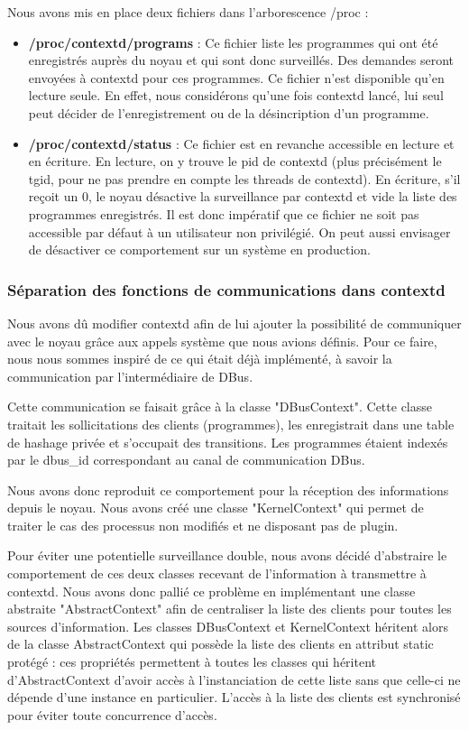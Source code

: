 \documentclass[pdftex,a4paper,titlepage,11pt]{article}
\begin{document}
Nous avons mis en place deux fichiers dans l'arborescence /proc :

	\begin{itemize}
		\item \textbf{/proc/contextd/programs} : Ce fichier liste les programmes qui ont été enregistrés auprès du noyau et qui sont donc surveillés. Des demandes seront envoyées à contextd pour ces programmes. Ce fichier n'est disponible qu'en lecture seule. En effet, nous considérons qu'une fois contextd lancé, lui seul peut décider de l'enregistrement ou de la désincription d'un programme.
		\item \textbf{/proc/contextd/status} : Ce fichier est en revanche accessible en lecture et en écriture. En lecture, on y trouve le pid de contextd (plus précisément le tgid, pour ne pas prendre en compte les threads de contextd). En écriture, s'il reçoit un 0, le noyau désactive la surveillance par contextd et vide la liste des programmes enregistrés. Il est donc impératif que ce fichier ne soit pas accessible par défaut à un utilisateur non privilégié. On peut aussi envisager de désactiver ce comportement sur un système en production.
	\end{itemize}

\subsubsection{Séparation des fonctions de communications dans contextd}

Nous avons dû modifier contextd afin de lui ajouter la possibilité de communiquer avec le noyau grâce aux appels système que nous avions définis. Pour ce faire, nous nous sommes inspiré de ce qui était déjà implémenté, à savoir la communication par l'intermédiaire de DBus.

Cette communication se faisait grâce à la classe "DBusContext". Cette classe traitait les sollicitations des clients (programmes), les enregistrait dans une table de hashage privée et s'occupait des transitions. Les programmes étaient indexés par le dbus\_id correspondant au canal de communication DBus.

Nous avons donc reproduit ce comportement pour la réception des informations depuis le noyau. Nous avons créé une classe "KernelContext" qui permet de traiter le cas des processus non modifiés et ne disposant pas de plugin.

Pour éviter une potentielle surveillance double, nous avons décidé d'abstraire le comportement de ces deux classes recevant de l'information à transmettre à contextd. Nous avons donc pallié ce problème en implémentant une classe abstraite "AbstractContext" afin de centraliser la liste des clients pour toutes les sources d'information. Les classes DBusContext et KernelContext héritent alors de la classe AbstractContext qui possède la liste des clients en attribut static protégé : ces propriétés permettent à toutes les classes qui héritent d'AbstractContext d'avoir accès à l'instanciation de cette liste sans que celle-ci ne dépende d'une instance en particulier. L'accès à la liste des clients est synchronisé pour éviter toute concurrence d'accès.
\end{document}
